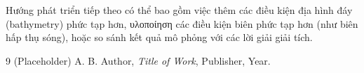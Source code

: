 \documentclass[12pt, a4paper]{article}
\begin{document}
Hướng phát triển tiếp theo có thể bao gồm việc thêm các điều kiện địa hình đáy (bathymetry) phức tạp hơn, υλοποίηση các điều kiện biên phức tạp hơn (như biên hấp thụ sóng), hoặc so sánh kết quả mô phỏng với các lời giải giải tích.

\begin{thebibliography}{9}
    (Placeholder) A. B. Author, \textit{Title of Work}, Publisher, Year.
\end{thebibliography}
\end{document}

